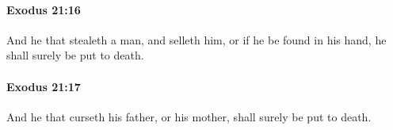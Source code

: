 		\paragraph{Exodus 21:16} %
			\label{EXODUS-21-16}

			And he that stealeth a man, and selleth him, or if he be found in his hand, he shall surely be put to death.


		\paragraph{Exodus 21:17} %
			\label{EXODUS-21-17}

			And he that curseth his father, or his mother, shall surely be put to death.


